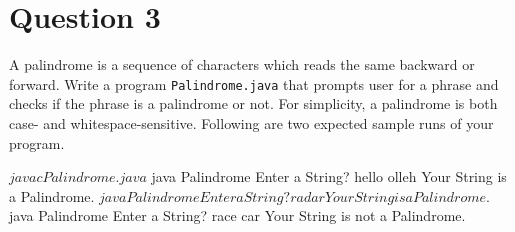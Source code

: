 \documentclass[12pt,letterpaper,twoside]{article}
\begin{document}
\newpage

\section*{Question 3}

A palindrome is a sequence of characters which reads the same backward or forward.
Write a program \texttt{Palindrome.java} that prompts user for a phrase and checks if the phrase is a palindrome or not.
For simplicity, a palindrome is both case- and whitespace-sensitive.
Following are two expected sample runs of your program.

\begin{terminal}
$ javac Palindrome.java
$ java Palindrome
Enter a String? hello olleh
Your String is a Palindrome.
$ java Palindrome
Enter a String? radar
Your String is a Palindrome.
$ java Palindrome
Enter a String? race car
Your String is not a Palindrome.
\end{terminal}
\end{document}
